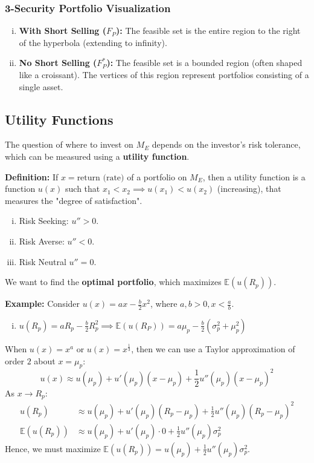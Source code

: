 \subsubsection{3-Security Portfolio Visualization}
\begin{enumerate}[i.]
    \item \textbf{With Short Selling ($F_P$):} The feasible set is the entire region to the right of the hyperbola (extending to infinity).
    \item \textbf{No Short Selling ($F_P^*$):} The feasible set is a bounded region (often shaped like a croissant). The vertices of this region represent portfolios consisting of a single asset.
\end{enumerate}

\subsection{Utility Functions}
The question of where to invest on \(M_E\) depends on the investor's risk tolerance, which can be measured using a \textbf{utility function}.

\textbf{Definition: } If \(x = \text{return (rate)}\) of a portfolio on \(M_E\), then a utility function is a function \(u(x)\) such that \(x_1 < x_2 \implies u(x_1) < u(x_2)\) (increasing), that measures the "degree of satisfaction".
\begin{enumerate}[i.]
    \item Risk Seeking: \(u'' > 0\).
    \item Risk Averse: \(u'' < 0\).
    \item Risk Neutral \(u'' = 0\).
\end{enumerate}
We want to find the \textbf{optimal portfolio}, which maximizes \(\mathbb{E}(u(R_p))\).

\textbf{Example: } Consider \(u(x) = ax-\frac{b}{2}x^2\), where \(a, b > 0, x < \frac{a}{b}\).
\begin{enumerate}[i.]
    \item \(u(R_p) = aR_p - \frac{b}{2}R_p^2 \implies \mathbb{E}(u(R_P)) = a\mu_p - \frac{b}{2}(\sigma_p^2 + \mu_p^2)\)
\end{enumerate}

When \(u(x)=x^a\) or \(u(x) = x^{\frac{1}{3}}\), then we can use a Taylor approximation of order \(2\) about \(x = \mu_p\):
\begin{equation*}
    u(x) \approx u(\mu_p) + u'(\mu_p)(x-\mu_p) + \frac{1}{2}u''(\mu_p)(x-\mu_p)^2
\end{equation*}
As \(x \to R_p\):
\begin{align*}
    u(R_p) &\approx u(\mu_p) + u'(\mu_p)(R_p-\mu_p) + \frac{1}{2}u''(\mu_p)(R_p-\mu_p)^2 \\
    \mathbb{E}(u(R_p)) &\approx u(\mu_p) + u'(\mu_p) \cdot 0 + \frac{1}{2}u''(\mu_p)\sigma_p^2
\end{align*}
Hence, we must maximize \(\mathbb{E}(u(R_p)) = u(\mu_p) + \frac{1}{2}u''(\mu_p)\sigma_p^2\).

